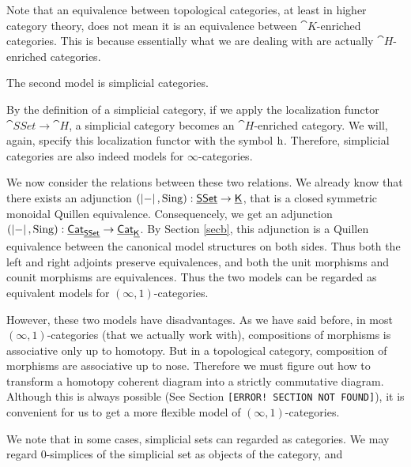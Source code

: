 Note that an equivalence between topological categories, at least in higher category theory, does not mean it is an equivalence
between $\cat K$-enriched categories. This is because essentially what we are dealing with are actually $\cat{H}$-enriched categories.

The second model is simplicial categories.


By the definition of a simplicial category, if we apply the localization functor $\cat{SSet}\to\cat H$, a simplicial category becomes an
$\cat{H}$-enriched category. We will, again, specify this localization functor with the symbol $\mathrm{h}$. Therefore, simplicial categories
are also indeed models for $\infty$-categories. 


We now consider the relations between these two relations. We already know that there exists an adjunction $(\left|-\right|,\operatorname{Sing}):\underline{\smash{\mathsf{SSet}}}\to\underline{\smash{\mathsf{K}}}$,
that is a closed symmetric monoidal Quillen equivalence. Consequencely, we get an adjunction 
$(\left|-\right|,\operatorname{Sing}):\underline{\smash{\mathsf{Cat}}}_{\underline{\smash{\mathsf{SSet}}}}\to\underline{\smash{\mathsf{Cat}}}_{\underline{\smash{\mathsf{K}}}}$. By Section \ref{secb}, this adjunction is a Quillen equivalence between the
canonical model structures on both sides. Thus both the left and right adjoints preserve equivalences, and both the unit morphisms 
and counit morphisms are equivalences. Thus the two models can be regarded as equivalent models for $(\infty,1)$-categories.

However, these two models have disadvantages. As we have said before, in most $(\infty,1)$-categories (that we actually work with), compositions
of morphisms is associative only up to homotopy. But in a topological category, composition of morphisms are associative up to nose. 
Therefore we must figure out how to transform a homotopy coherent diagram into a strictly commutative diagram. Although this is always
possible (See Section {\color{red}\texttt{[ERROR! SECTION NOT FOUND]}}), it is convenient for us to get a more flexible model 
of $(\infty,1)$-categories.

We note that in some cases, simplicial sets can regarded as categories. We may regard 0-simplices of the simplicial set as objects of the category,
and 